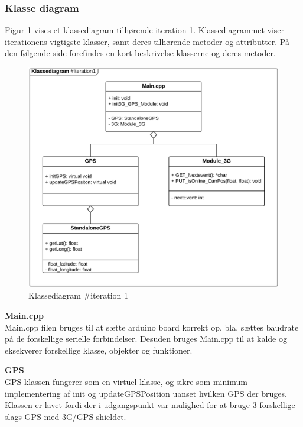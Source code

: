 \subsubsection*{Klasse diagram}
\vspace{-0.1cm}
Figur \ref{fig:classDiagram_iteration1} vises et klassediagram tilhørende iteration 1. Klassediagrammet viser iterationens vigtigste klasser, samt deres tilhørende metoder og attributter. På den følgende side forefindes en kort beskrivelse klasserne og deres metoder.
\begin{figure}[H]
	\centering
	\includegraphics[width=1\textwidth]{Billeder/klasse_diagrammer/classdiagram_iteration1.png}
	\vspace{-0.5cm}
	\caption{Klassediagram \#iteration 1}
	\label{fig:classDiagram_iteration1}
\end{figure}

\newpage

\textbf{Main.cpp} \\
Main.cpp filen bruges til at sætte arduino board korrekt op, bla. sættes baudrate på de forskellige serielle forbindelser. Desuden bruges Main.cpp til at kalde og eksekverer forskellige klasse, objekter og funktioner.

\textbf{GPS} \\
GPS klassen fungerer som en virtuel klasse, og sikre som minimum implementering af init og updateGPSPosition uanset hvilken GPS der bruges. Klassen er lavet fordi der i udgangspunkt var mulighed for at bruge 3 forskellige slags GPS med 3G/GPS shieldet. 

